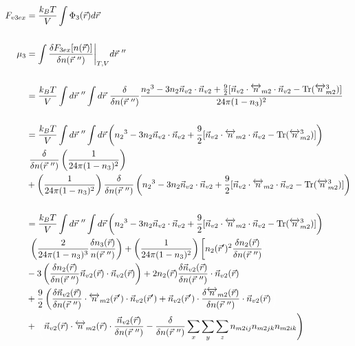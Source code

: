 \documentclass[double,12pt]{beavtex}
\begin{document}
\begin{align}
  F_{v3ex} &= \frac{k_BT}{V}\int \Phi_3(\vec r) d\vec r  \\ 
  \nonumber\\ 
  \mu_3 &= \int \frac{\delta F_{3ex}[n(\vec r)]}{\delta n(\vec r~'')}
  \bigg|_{T,V} d\vec r~'' \\ \nonumber \\
%
   &= \frac{k_BT}{V}\int d\vec r~''\int d\vec r~\frac{\delta}{\delta 
    n(\vec r~'')}\frac{{n_2}^3-3n_2\vec{n}_{v2}\cdot\vec{n}_{v2}+\frac{9}{2}
    [\vec{n}_{v2}\cdot{\overleftrightarrow{n}_{m2}}\cdot{\vec{n}_{v2}}
    -\operatorname{Tr}({\overleftrightarrow{n}^3_{m2}})]}{24\pi(1-n_3)^2}
     \nonumber \\ \\
%
     &=\frac{k_BT}{V}\int d\vec r~''\int d\vec r \left( {n_2}^3-3n_2
     \vec{n}_{v2}\cdot\vec{n}_{v2} 
     +\frac{9}{2}[\vec{n}_{v2}\cdot{\overleftrightarrow{n}_{m2}}\cdot{
     \vec{n}_{v2}}-\operatorname{Tr}({\overleftrightarrow{n}^3_{m2}})]
     \right) \nonumber\\
      &~ \frac{\delta}{\delta n(\vec r~'')}\left(\frac{1}{24\pi(1-n_3)^2}
      \right) \nonumber\\
     &+ \left(\frac{1}{24\pi(1-n_3)^2}\right)\frac{\delta}
     {\delta n(\vec r~'')}\left({n_2}^3-3n_2\vec{n}_{v2}\cdot\vec{n}_{v2}
     +\frac{9}{2}[\vec{n}_{v2}\cdot{\overleftrightarrow{n}_{m2}}\cdot{
     \vec{n}_{v2}}-\operatorname{Tr}({\overleftrightarrow{n}^3_{m2}})]
     \right) \\ \nonumber \\
%
    &=\frac{k_BT}{V}\int d\vec r~''\int d\vec r\left( {n_2}^3-3n_2
    \vec{n}_{v2}\cdot\vec{n}_{v2} 
     +\frac{9}{2}[\vec{n}_{v2}\cdot{\overleftrightarrow{n}_{m2}}\cdot{
     \vec{n}_{v2}}-\operatorname{Tr}({\overleftrightarrow{n}^3_{m2}})]
     \right) \nonumber\\
     &~\left(\frac{2}{24\pi(1-n_3)^3}\frac{\delta n_3(\vec r)}{n(\vec r~'')}
     \right) 
     + \left(\frac{1}{24\pi(1-n_3)^2}\right)\left[n_2(\vec r')^2
     \frac{\delta n_2(\vec r)}{\delta n(\vec r~'')} \color{white}\right]
      \nonumber\\
     &- 3\left(\frac{\delta n_{2}(\vec r)}{\delta n(\vec r~'')}\vec n_{v2}
     (\vec r) \cdot \vec n_{v2}(\vec r)\right) + 2n_2(\vec r)\frac{\delta
     \vec n_{v2}(\vec r)}{\delta n(\vec r~'')}\cdot \vec n_{v2}(\vec r) 
     \nonumber\\
     &+\frac{9}{2}\left(\frac{\delta \vec n_{v2}(\vec r)}{\delta n(\vec r~'')}
     \cdot \overleftrightarrow n_{m2}(\vec r')\cdot \vec n_{v2}( \vec r')
     +\vec n_{v2}(\vec r')\cdot \frac{\delta \overleftrightarrow n_{m2}
     (\vec r)}{\delta n(\vec r~'')}\cdot \vec n_{v2}( \vec r)\color{white}
     \right)\nonumber\\
     &+ \color{white}\left(\color{black}\vec n_{v2}( \vec r)\cdot 
     \overleftrightarrow n_{m2}(\vec r)
     \cdot \frac{\vec n_{v2}( \vec r)}{\delta n(\vec r~'')}-
     \frac{\delta}{\delta n(\vec r~'')}\sum_x\sum_y\sum_z n_{m2ij}n_{m2jk}
     n_{m2ik}\right) 
\end{align} 
\end{document}
